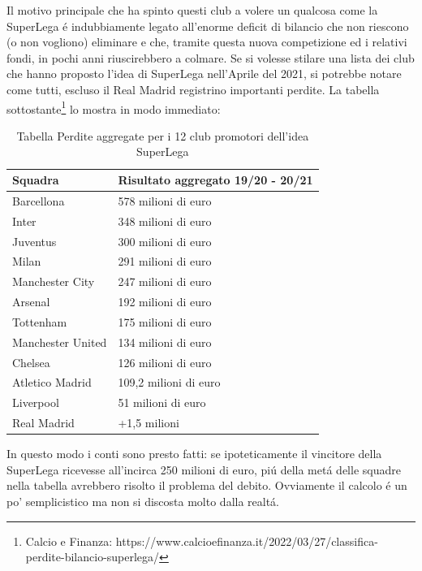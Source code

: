 \documentclass[
    corpo=12pt,
    oneside,
    evenboxes,
    tipotesi=triennale,
    stile=classica,
    oldstyle,
    autoretitolo,
    greek,
]{toptesi}
\begin{document}
\begin{interlinea}{1.5}
Il motivo principale che ha spinto questi club a volere un qualcosa come la SuperLega \'e indubbiamente legato all'enorme deficit
di bilancio che non riescono (o non vogliono) eliminare e che, tramite questa nuova competizione ed i relativi fondi, in pochi anni riuscirebbero a colmare.
Se si volesse stilare una lista dei club che hanno proposto l'idea di SuperLega nell'Aprile del 2021, si potrebbe notare come tutti, escluso 
il Real Madrid registrino importanti perdite. La tabella sottostante\footnote{Calcio e Finanza: https://www.calcioefinanza.it/2022/03/27/classifica-perdite-bilancio-superlega/} lo mostra in modo immediato:\newpage
\begin{table}
    \begin{tabularx}{\textwidth}{XX}
        \toprule
        \textbf{Squadra} & \textbf{Risultato aggregato 19/20 - 20/21} \\
        \midrule
        Barcellona & 578 milioni di euro \\
        \midrule
        Inter & 348 milioni di euro \\
        \midrule
        Juventus & 300 milioni di euro \\
        \midrule
        Milan & 291 milioni di euro \\
        \midrule
        Manchester City & 247 milioni di euro \\
        \midrule
        Arsenal & 192 milioni di euro \\
        \midrule
        Tottenham & 175 milioni di euro \\
        \midrule
        Manchester United & 134 milioni di euro \\
        \midrule
        Chelsea & 126 milioni di euro \\
        \midrule
        Atletico Madrid & 109,2 milioni di euro \\
        \midrule
        Liverpool & 51 milioni di euro \\
        \midrule
        Real Madrid & +1,5 milioni \\
        \bottomrule
    \end{tabularx}
    \caption{Tabella Perdite aggregate per i 12 club promotori dell'idea SuperLega}
    \label{tabella_ris_sl}
\end{table}
In questo modo i conti sono presto fatti: se ipoteticamente il vincitore della SuperLega ricevesse all'incirca 250 milioni di euro, pi\'u
della met\'a delle squadre nella tabella avrebbero risolto il problema del debito. Ovviamente il calcolo \'e un po' semplicistico ma non 
si discosta molto dalla realt\'a.

\end{interlinea}
\end{document}

